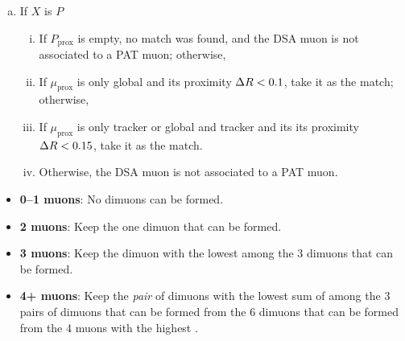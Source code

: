 \begin{enumerate}
\begin{enumerate}[a.]
\begin{enumerate}[i.]
        \end{enumerate}
      \item If $X$ is $P$
        \begin{enumerate}[i.]
          \item If $P_\text{prox}$ is empty, no match was found, and the DSA muon is not associated to a PAT muon; otherwise,
          \item If $\mu_\text{prox}$ is only global and its proximity $\Delta R < 0.1$, take it as the match; otherwise,
          \item If $\mu_\text{prox}$ is only tracker or global and tracker and its its proximity $\Delta R < 0.15$, take it as the match.
          \item Otherwise, the DSA muon is not associated to a PAT muon.
        \end{enumerate}
    \end{enumerate}
\end{enumerate}

\begin{itemize}
  \item \textbf{0--1 muons}: No dimuons can be formed.
  \item    \textbf{2 muons}: Keep the one dimuon that can be formed.
  \item    \textbf{3 muons}: Keep the dimuon with the lowest \vchisq among the 3 dimuons that can be formed.
  \item   \textbf{4+ muons}: Keep the \emph{pair} of dimuons with the lowest sum of \vchisq among the 3 pairs of dimuons that can be formed from the 6 dimuons that can be formed from the 4 muons with the highest \pT.
\end{itemize}
